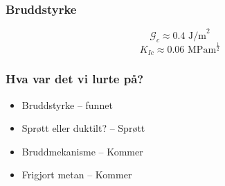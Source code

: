 \documentclass[utf8x, notes, graphics]{beamer}
\begin{document}
\begin{frame}
\frametitle{Bruddstyrke}
\begin{equation*}
\mathcal{G}_c \approx 0.4 \text{ J/m}^2
\end{equation*}
\begin{equation*}
K_{Ic} \approx 0.06 \text{ MPam}^\frac{1}{2}
\end{equation*}
\vspace{5mm}
\vspace{5mm}
\end{frame}


\begin{frame}
\frametitle{Hva var det vi lurte på?}
\begin{itemize}
\item Bruddstyrke -- funnet
\item Sprøtt eller duktilt? -- Sprøtt
\item Bruddmekanisme -- Kommer
\item Frigjort metan -- Kommer
\end{itemize}
\end{frame}
\end{document}
